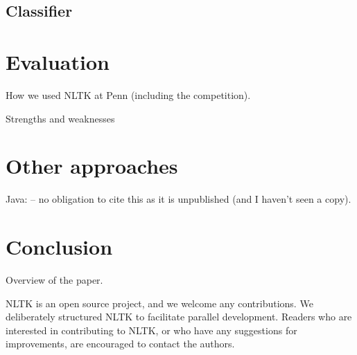 \documentclass[11pt]{article}
\begin{document}
\subsection{Classifier}


\section{Evaluation}

How we used NLTK at Penn (including the competition).

Strengths and weaknesses

\section{Other approaches}

Java: \cite{Hammond02}
-- no obligation to cite this as it is unpublished
(and I haven't seen a copy).

\section{Conclusion}

Overview of the paper.

NLTK is an open source project, and we welcome any contributions.  We
deliberately structured NLTK to facilitate parallel development.
Readers who are interested in contributing to NLTK, or who have any
suggestions for improvements, are encouraged to contact the authors.



\end{document}
